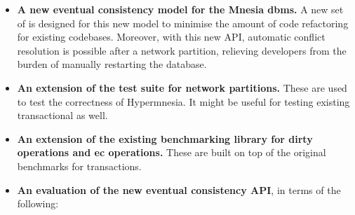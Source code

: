 \begin{itemize}
  \item \textbf{A new eventual consistency model for the Mnesia \acrshort{dbms}.}
  A new set of  is designed for this new model to minimise the 
  amount of code refactoring for existing codebases. Moreover, with this new API, 
  automatic conflict resolution is
  possible after a network partition, relieving developers from the burden
  of manually restarting the database.
  \item \textbf{An extension of the test suite for network partitions.}
  These are used to test the correctness of Hypermnesia. It might
  be useful for testing existing transactional  as well.
  \item \textbf{An extension of the existing benchmarking library for dirty operations
  and \acrshort{ec} operations.} These are built on top of the original benchmarks 
  for transactions.
  \item \textbf{An evaluation of the new eventual consistency API}, in terms of the
  following:

\end{itemize}

